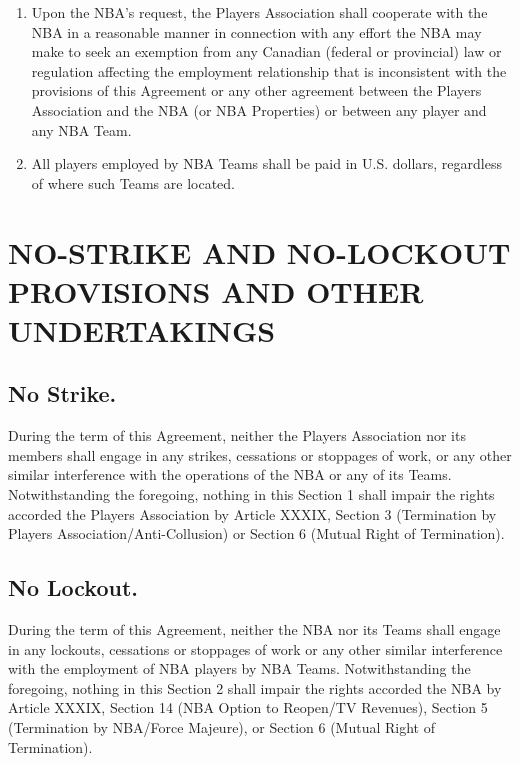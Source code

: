 \documentclass[
]{book}
\begin{document}
\begin{enumerate}
\item
  Upon the NBA's request, the Players Association shall cooperate with the NBA in a reasonable manner in connection with any effort the NBA may make to seek an exemption from any Canadian (federal or provincial) law or regulation affecting the employment relationship that is inconsistent with the provisions of this Agreement or any other agreement between the Players Association and the NBA (or NBA Properties) or between any player and any NBA Team.
\item
  All players employed by NBA Teams shall be paid in U.S. dollars, regardless of where such Teams are located.
\end{enumerate}

\hypertarget{no-strike-and-no-lockout-provisions-and-other-undertakings}{%
\chapter{NO-STRIKE AND NO-LOCKOUT PROVISIONS AND OTHER UNDERTAKINGS}\label{no-strike-and-no-lockout-provisions-and-other-undertakings}}


\hypertarget{no-strike.}{%
\section{No Strike.}\label{no-strike.}}

During the term of this Agreement, neither the Players Association nor its members shall engage in any strikes, cessations or stoppages of work, or any other similar interference with the operations of the NBA or any of its Teams. Notwithstanding the foregoing, nothing in this Section 1 shall impair the rights accorded the Players Association by Article XXXIX, Section 3 (Termination by Players Association/Anti-Collusion) or Section 6 (Mutual Right of Termination).

\hypertarget{no-lockout.}{%
\section{No Lockout.}\label{no-lockout.}}

During the term of this Agreement, neither the NBA nor its Teams shall engage in any lockouts, cessations or stoppages of work or any other similar interference with the employment of NBA players by NBA Teams. Notwithstanding the foregoing, nothing in this Section 2 shall impair the rights accorded the NBA by Article XXXIX, Section 14 (NBA Option to Reopen/TV Revenues), Section 5 (Termination by NBA/Force Majeure), or Section 6 (Mutual Right of Termination).
\end{document}
